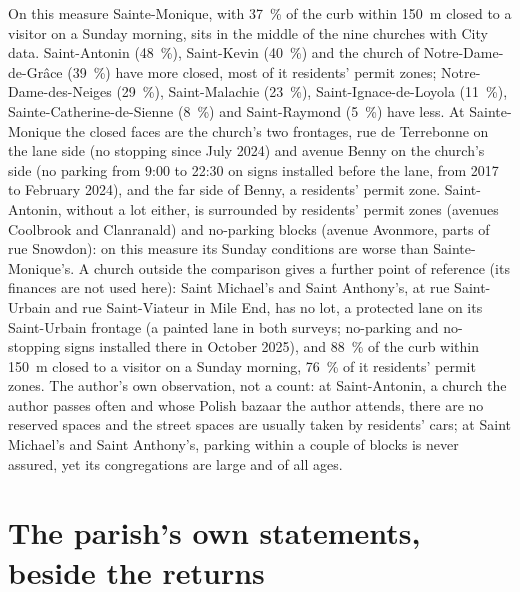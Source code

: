\documentclass[11pt,letterpaper]{article}
\begin{document}
On this measure Sainte-Monique, with 37~\% of the curb within 150~m closed to a visitor on a Sunday morning, sits in the middle of the nine churches with City data. Saint-Antonin (48~\%), Saint-Kevin (40~\%) and the church of Notre-Dame-de-Grâce (39~\%) have more closed, most of it residents' permit zones; Notre-Dame-des-Neiges (29~\%), Saint-Malachie (23~\%), Saint-Ignace-de-Loyola (11~\%), Sainte-Catherine-de-Sienne (8~\%) and Saint-Raymond (5~\%) have less. At Sainte-Monique the closed faces are the church's two frontages, rue de Terrebonne on the lane side (no stopping since July 2024) and avenue Benny on the church's side (no parking from 9:00 to 22:30 on signs installed before the lane, from 2017 to February 2024), and the far side of Benny, a residents' permit zone. Saint-Antonin, without a lot either, is surrounded by residents' permit zones (avenues Coolbrook and Clanranald) and no-parking blocks (avenue Avonmore, parts of rue Snowdon): on this measure its Sunday conditions are worse than Sainte-Monique's. A church outside the comparison gives a further point of reference (its finances are not used here): Saint Michael's and Saint Anthony's, at rue Saint-Urbain and rue Saint-Viateur in Mile End, has no lot, a protected lane on its Saint-Urbain frontage (a painted lane in both surveys; no-parking and no-stopping signs installed there in October 2025), and 88~\% of the curb within 150~m closed to a visitor on a Sunday morning, 76~\% of it residents' permit zones. The author's own observation, not a count: at Saint-Antonin, a church the author passes often and whose Polish bazaar the author attends, there are no reserved spaces and the street spaces are usually taken by residents' cars; at Saint Michael's and Saint Anthony's, parking within a couple of blocks is never assured, yet its congregations are large and of all ages.

\section{The parish's own statements, beside the returns}\label{sec:statements}
\end{document}
